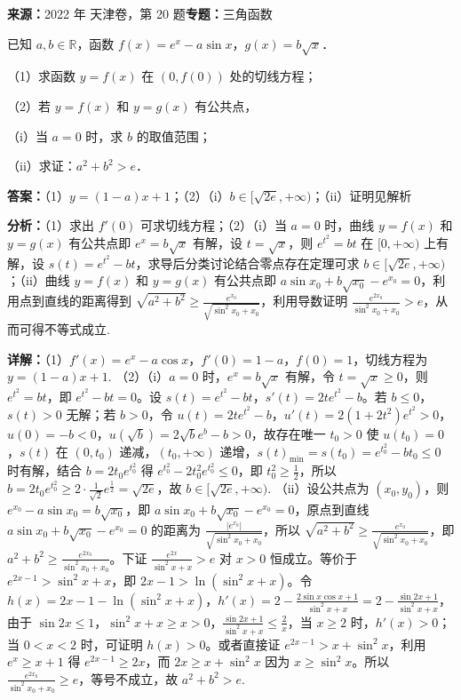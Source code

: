 \begin{question}[points=15]
\textbf{来源：}2022 年 天津卷，第 20 题\quad \textbf{专题：}三角函数\par
已知 $a,b\in\mathbb{R}$，函数 $f(x)=e^x-a\sin x$，$g(x)=b\sqrt{x}$．

（1）求函数 $y=f(x)$ 在 $(0,f(0))$ 处的切线方程；

（2）若 $y=f(x)$ 和 $y=g(x)$ 有公共点，

（i）当 $a=0$ 时，求 $b$ 的取值范围；

（ii）求证：$a^2+b^2>e$．
\begin{solution}
\textbf{答案：}（1）$y=(1-a)x+1$；（2）（i）$b\in[\sqrt{2e},+\infty)$；（ii）证明见解析

\textbf{分析：}（1）求出 $f'(0)$ 可求切线方程；（2）（i）当 $a=0$ 时，曲线 $y=f(x)$ 和 $y=g(x)$ 有公共点即 $e^x=b\sqrt{x}$ 有解，设 $t=\sqrt{x}$，则 $e^{t^2}=bt$ 在 $[0,+\infty)$ 上有解，设 $s(t)=e^{t^2}-bt$，求导后分类讨论结合零点存在定理可求 $b\in[\sqrt{2e},+\infty)$；（ii）曲线 $y=f(x)$ 和 $y=g(x)$ 有公共点即 $a\sin x_0+b\sqrt{x_0}-e^{x_0}=0$，利用点到直线的距离得到 $\sqrt{a^2+b^2}\ge\frac{e^{x_0}}{\sqrt{\sin^2 x_0+x_0}}$，利用导数证明 $\frac{e^{2x_0}}{\sin^2 x_0+x_0}>e$，从而可得不等式成立.

\textbf{详解：}（1）$f'(x)=e^x-a\cos x$，$f'(0)=1-a$，$f(0)=1$，切线方程为 $y=(1-a)x+1$.
（2）（i）$a=0$ 时，$e^x=b\sqrt{x}$ 有解，令 $t=\sqrt{x}\ge0$，则 $e^{t^2}=bt$，即 $e^{t^2}-bt=0$。设 $s(t)=e^{t^2}-bt$，$s'(t)=2te^{t^2}-b$。若 $b\le0$，$s(t)>0$ 无解；若 $b>0$，令 $u(t)=2te^{t^2}-b$，$u'(t)=2(1+2t^2)e^{t^2}>0$，$u(0)=-b<0$，$u(\sqrt{b})=2\sqrt{b}e^{b}-b>0$，故存在唯一 $t_0>0$ 使 $u(t_0)=0$，$s(t)$ 在 $(0,t_0)$ 递减，$(t_0,+\infty)$ 递增，$s(t)_{\min}=s(t_0)=e^{t_0^2}-bt_0\le0$ 时有解，结合 $b=2t_0e^{t_0^2}$ 得 $e^{t_0^2}-2t_0^2e^{t_0^2}\le0$，即 $t_0^2\ge\frac{1}{2}$，所以 $b=2t_0e^{t_0^2}\ge2\cdot\frac{1}{\sqrt{2}}e^{\frac{1}{2}}=\sqrt{2e}$，故 $b\in[\sqrt{2e},+\infty)$.
（ii）设公共点为 $(x_0,y_0)$，则 $e^{x_0}-a\sin x_0=b\sqrt{x_0}$，即 $a\sin x_0+b\sqrt{x_0}-e^{x_0}=0$，原点到直线 $a\sin x_0+b\sqrt{x_0}-e^{x_0}=0$ 的距离为 $\frac{|e^{x_0}|}{\sqrt{\sin^2 x_0+x_0}}$，所以 $\sqrt{a^2+b^2}\ge\frac{e^{x_0}}{\sqrt{\sin^2 x_0+x_0}}$，即 $a^2+b^2\ge\frac{e^{2x_0}}{\sin^2 x_0+x_0}$。下证 $\frac{e^{2x}}{\sin^2 x+x}>e$ 对 $x>0$ 恒成立。等价于 $e^{2x-1}>\sin^2 x+x$，即 $2x-1>\ln(\sin^2 x+x)$。令 $h(x)=2x-1-\ln(\sin^2 x+x)$，$h'(x)=2-\frac{2\sin x\cos x+1}{\sin^2 x+x}=2-\frac{\sin2x+1}{\sin^2 x+x}$，由于 $\sin2x\le1$，$\sin^2 x+x\ge x>0$，$\frac{\sin2x+1}{\sin^2 x+x}\le\frac{2}{x}$，当 $x\ge2$ 时，$h'(x)>0$；当 $0<x<2$ 时，可证明 $h(x)>0$。或者直接证 $e^{2x-1}>x+\sin^2 x$，利用 $e^x\ge x+1$ 得 $e^{2x-1}\ge2x$，而 $2x\ge x+\sin^2 x$ 因为 $x\ge\sin^2 x$。所以 $\frac{e^{2x_0}}{\sin^2 x_0+x_0}\ge e$，等号不成立，故 $a^2+b^2>e$.
\end{solution}
\end{question}

